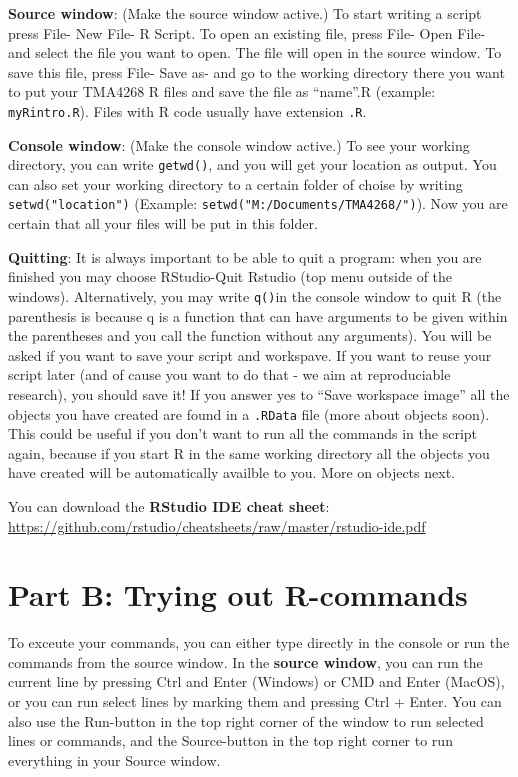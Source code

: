 \documentclass[]{article}
\begin{document}
\textbf{Source window}: (Make the source window active.) To start
writing a script press File- New File- R Script. To open an existing
file, press File- Open File- and select the file you want to open. The
file will open in the source window. To save this file, press File- Save
as- and go to the working directory there you want to put your TMA4268 R
files and save the file as ``name''.R (example: \texttt{myRintro.R}).
Files with R code usually have extension \texttt{.R}.

\textbf{Console window}: (Make the console window active.) To see your
working directory, you can write \texttt{getwd()}, and you will get your
location as output. You can also set your working directory to a certain
folder of choise by writing \texttt{setwd("location")} (Example:
\texttt{setwd("M:/Documents/TMA4268/")}). Now you are certain that all
your files will be put in this folder.

\textbf{Quitting}: It is always important to be able to quit a program:
when you are finished you may choose RStudio-Quit Rstudio (top menu
outside of the windows). Alternatively, you may write \texttt{q()}in the
console window to quit R (the parenthesis is because q is a function
that can have arguments to be given within the parentheses and you call
the function without any arguments). You will be asked if you want to
save your script and workspave. If you want to reuse your script later
(and of cause you want to do that - we aim at reproduciable research),
you should save it! If you answer yes to ``Save workspace image'' all
the objects you have created are found in a \texttt{.RData} file (more
about objects soon). This could be useful if you don't want to run all
the commands in the script again, because if you start R in the same
working directory all the objects you have created will be automatically
availble to you. More on objects next.

You can download the \textbf{RStudio IDE cheat sheet}:
\url{https://github.com/rstudio/cheatsheets/raw/master/rstudio-ide.pdf}

\section{Part B: Trying out
R-commands}\label{part-b-trying-out-r-commands}

To exceute your commands, you can either type directly in the console or
run the commands from the source window. In the \textbf{source window},
you can run the current line by pressing Ctrl and Enter (Windows) or CMD
and Enter (MacOS), or you can run select lines by marking them and
pressing Ctrl + Enter. You can also use the Run-button in the top right
corner of the window to run selected lines or commands, and the
Source-button in the top right corner to run everything in your Source
window.
\end{document}
